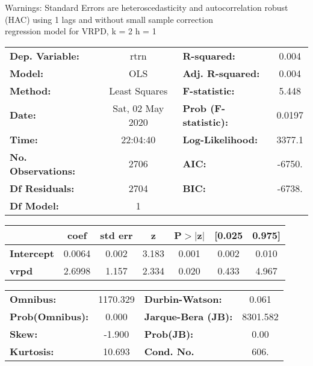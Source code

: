 Warnings: \newline
 [1] Standard Errors are heteroscedasticity and autocorrelation robust (HAC) using 1 lags and without small sample correction\\ 

regression model for VRPD, k = 2 h = 1\begin{center}
\begin{tabular}{lclc}
\toprule
\textbf{Dep. Variable:}    &       rtrn       & \textbf{  R-squared:         } &     0.004   \\
\textbf{Model:}            &       OLS        & \textbf{  Adj. R-squared:    } &     0.004   \\
\textbf{Method:}           &  Least Squares   & \textbf{  F-statistic:       } &     5.448   \\
\textbf{Date:}             & Sat, 02 May 2020 & \textbf{  Prob (F-statistic):} &   0.0197    \\
\textbf{Time:}             &     22:04:40     & \textbf{  Log-Likelihood:    } &    3377.1   \\
\textbf{No. Observations:} &        2706      & \textbf{  AIC:               } &    -6750.   \\
\textbf{Df Residuals:}     &        2704      & \textbf{  BIC:               } &    -6738.   \\
\textbf{Df Model:}         &           1      & \textbf{                     } &             \\
\bottomrule
\end{tabular}
\begin{tabular}{lcccccc}
                   & \textbf{coef} & \textbf{std err} & \textbf{z} & \textbf{P$> |$z$|$} & \textbf{[0.025} & \textbf{0.975]}  \\
\midrule
\textbf{Intercept} &       0.0064  &        0.002     &     3.183  &         0.001        &        0.002    &        0.010     \\
\textbf{vrpd}      &       2.6998  &        1.157     &     2.334  &         0.020        &        0.433    &        4.967     \\
\bottomrule
\end{tabular}
\begin{tabular}{lclc}
\textbf{Omnibus:}       & 1170.329 & \textbf{  Durbin-Watson:     } &    0.061  \\
\textbf{Prob(Omnibus):} &   0.000  & \textbf{  Jarque-Bera (JB):  } & 8301.582  \\
\textbf{Skew:}          &  -1.900  & \textbf{  Prob(JB):          } &     0.00  \\
\textbf{Kurtosis:}      &  10.693  & \textbf{  Cond. No.          } &     606.  \\
\bottomrule
\end{tabular}
\end{center}

